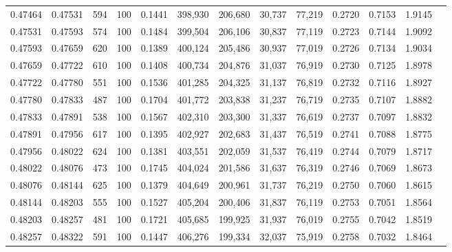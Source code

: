 \begin{tabular}{rrrrrrrrrrrrr}
0.47464 & 0.47531 &   594 & 100 &                                     0.1441 & 398,930 & 206,680 &  30,737 &  77,219 & 0.2720 & 0.7153 & 1.9145 \\
0.47531 & 0.47593 &   574 & 100 &                                     0.1484 & 399,504 & 206,106 &  30,837 &  77,119 & 0.2723 & 0.7144 & 1.9092 \\
0.47593 & 0.47659 &   620 & 100 &                                     0.1389 & 400,124 & 205,486 &  30,937 &  77,019 & 0.2726 & 0.7134 & 1.9034 \\
0.47659 & 0.47722 &   610 & 100 &                                     0.1408 & 400,734 & 204,876 &  31,037 &  76,919 & 0.2730 & 0.7125 & 1.8978 \\
0.47722 & 0.47780 &   551 & 100 &                                     0.1536 & 401,285 & 204,325 &  31,137 &  76,819 & 0.2732 & 0.7116 & 1.8927 \\
0.47780 & 0.47833 &   487 & 100 &                                     0.1704 & 401,772 & 203,838 &  31,237 &  76,719 & 0.2735 & 0.7107 & 1.8882 \\
0.47833 & 0.47891 &   538 & 100 &                                     0.1567 & 402,310 & 203,300 &  31,337 &  76,619 & 0.2737 & 0.7097 & 1.8832 \\
0.47891 & 0.47956 &   617 & 100 &                                     0.1395 & 402,927 & 202,683 &  31,437 &  76,519 & 0.2741 & 0.7088 & 1.8775 \\
0.47956 & 0.48022 &   624 & 100 &                                     0.1381 & 403,551 & 202,059 &  31,537 &  76,419 & 0.2744 & 0.7079 & 1.8717 \\
0.48022 & 0.48076 &   473 & 100 &                                     0.1745 & 404,024 & 201,586 &  31,637 &  76,319 & 0.2746 & 0.7069 & 1.8673 \\
0.48076 & 0.48144 &   625 & 100 &                                     0.1379 & 404,649 & 200,961 &  31,737 &  76,219 & 0.2750 & 0.7060 & 1.8615 \\
0.48144 & 0.48203 &   555 & 100 &                                     0.1527 & 405,204 & 200,406 &  31,837 &  76,119 & 0.2753 & 0.7051 & 1.8564 \\
0.48203 & 0.48257 &   481 & 100 &                                     0.1721 & 405,685 & 199,925 &  31,937 &  76,019 & 0.2755 & 0.7042 & 1.8519 \\
0.48257 & 0.48322 &   591 & 100 &                                     0.1447 & 406,276 & 199,334 &  32,037 &  75,919 & 0.2758 & 0.7032 & 1.8464 \\

\end{tabular}
